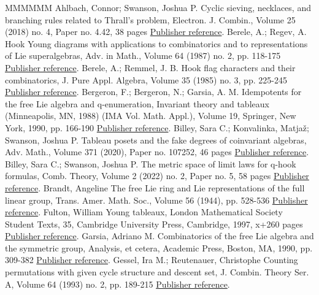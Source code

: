 \begin{thebibliography}{MMMMMM}
 Ahlbach, Connor; Swanson, Joshua P. Cyclic sieving, necklaces, and branching rules related to Thrall’s problem, Electron. J. Combin., Volume 25 (2018) no. 4, Paper no. 4.42, 38 pages \href{https://alco.centre-mersenne.org/articles/10.5802/alco.421/#AS}{Publisher reference}.
 Berele, A.; Regev, A. Hook Young diagrams with applications to combinatorics and to representations of Lie superalgebras, Adv. in Math., Volume 64 (1987) no. 2, pp. 118-175 \href{https://alco.centre-mersenne.org/articles/10.5802/alco.421/#BReg}{Publisher reference}.
 Berele, A.; Remmel, J. B. Hook flag characters and their combinatorics, J. Pure Appl. Algebra, Volume 35 (1985) no. 3, pp. 225-245 \href{https://alco.centre-mersenne.org/articles/10.5802/alco.421/#BRem}{Publisher reference}.
 Bergeron, F.; Bergeron, N.; Garsia, A. M. Idempotents for the free Lie algebra and q-enumeration, Invariant theory and tableaux (Minneapolis, MN, 1988) (IMA Vol. Math. Appl.), Volume 19, Springer, New York, 1990, pp. 166-190 \href{https://alco.centre-mersenne.org/articles/10.5802/alco.421/#BBG}{Publisher reference}.
 Billey, Sara C.; Konvalinka, Matjaž; Swanson, Joshua P. Tableau posets and the fake degrees of coinvariant algebras, Adv. Math., Volume 371 (2020), Paper no. 107252, 46 pages \href{https://alco.centre-mersenne.org/articles/10.5802/alco.421/#BKS}{Publisher reference}.
 Billey, Sara C.; Swanson, Joshua P. The metric space of limit laws for q-hook formulas, Comb. Theory, Volume 2 (2022) no. 2, Paper no. 5, 58 pages \href{https://alco.centre-mersenne.org/articles/10.5802/alco.421/#BS}{Publisher reference}.
 Brandt, Angeline The free Lie ring and Lie representations of the full linear group, Trans. Amer. Math. Soc., Volume 56 (1944), pp. 528-536 \href{https://alco.centre-mersenne.org/articles/10.5802/alco.421/#Brandt}{Publisher reference}.
 Fulton, William Young tableaux, London Mathematical Society Student Texts, 35, Cambridge University Press, Cambridge, 1997, x+260 pages \href{https://alco.centre-mersenne.org/articles/10.5802/alco.421/#Ful}{Publisher reference}.
 Garsia, Adriano M. Combinatorics of the free Lie algebra and the symmetric group, Analysis, et cetera, Academic Press, Boston, MA, 1990, pp. 309-382 \href{https://alco.centre-mersenne.org/articles/10.5802/alco.421/#Gar}{Publisher reference}.
 Gessel, Ira M.; Reutenauer, Christophe Counting permutations with given cycle structure and descent set, J. Combin. Theory Ser. A, Volume 64 (1993) no. 2, pp. 189-215 \href{https://alco.centre-mersenne.org/articles/10.5802/alco.421/#GR}{Publisher reference}.

\end{thebibliography}
